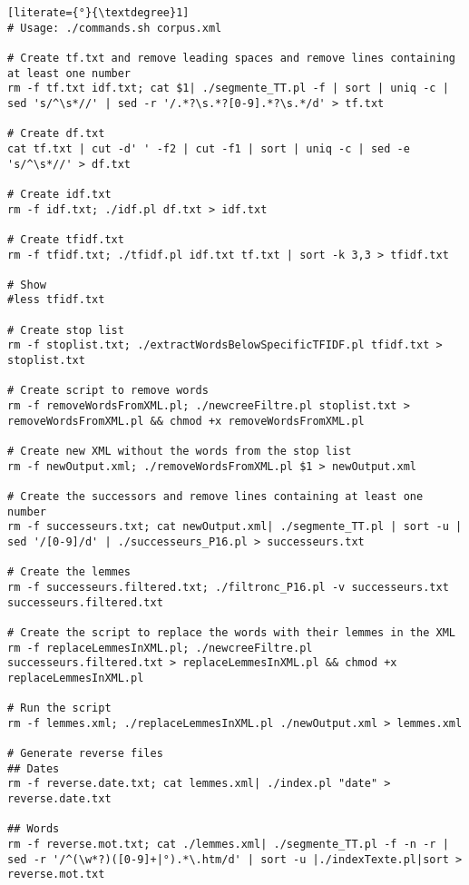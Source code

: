 \begin{lstlisting}[literate={°}{\textdegree}1]
# Usage: ./commands.sh corpus.xml

# Create tf.txt and remove leading spaces and remove lines containing at least one number
rm -f tf.txt idf.txt; cat $1| ./segmente_TT.pl -f | sort | uniq -c | sed 's/^\s*//' | sed -r '/.*?\s.*?[0-9].*?\s.*/d' > tf.txt

# Create df.txt
cat tf.txt | cut -d' ' -f2 | cut -f1 | sort | uniq -c | sed -e 's/^\s*//' > df.txt

# Create idf.txt
rm -f idf.txt; ./idf.pl df.txt > idf.txt

# Create tfidf.txt
rm -f tfidf.txt; ./tfidf.pl idf.txt tf.txt | sort -k 3,3 > tfidf.txt

# Show
#less tfidf.txt

# Create stop list
rm -f stoplist.txt; ./extractWordsBelowSpecificTFIDF.pl tfidf.txt > stoplist.txt

# Create script to remove words
rm -f removeWordsFromXML.pl; ./newcreeFiltre.pl stoplist.txt > removeWordsFromXML.pl && chmod +x removeWordsFromXML.pl

# Create new XML without the words from the stop list
rm -f newOutput.xml; ./removeWordsFromXML.pl $1 > newOutput.xml

# Create the successors and remove lines containing at least one number
rm -f successeurs.txt; cat newOutput.xml| ./segmente_TT.pl | sort -u | sed '/[0-9]/d' | ./successeurs_P16.pl > successeurs.txt

# Create the lemmes
rm -f successeurs.filtered.txt; ./filtronc_P16.pl -v successeurs.txt successeurs.filtered.txt

# Create the script to replace the words with their lemmes in the XML
rm -f replaceLemmesInXML.pl; ./newcreeFiltre.pl successeurs.filtered.txt > replaceLemmesInXML.pl && chmod +x replaceLemmesInXML.pl

# Run the script
rm -f lemmes.xml; ./replaceLemmesInXML.pl ./newOutput.xml > lemmes.xml

# Generate reverse files
## Dates
rm -f reverse.date.txt; cat lemmes.xml| ./index.pl "date" > reverse.date.txt

## Words
rm -f reverse.mot.txt; cat ./lemmes.xml| ./segmente_TT.pl -f -n -r | sed -r '/^(\w*?)([0-9]+|°).*\.htm/d' | sort -u |./indexTexte.pl|sort > reverse.mot.txt
\end{lstlisting}
